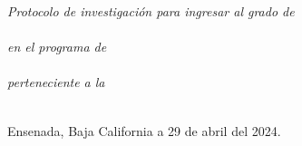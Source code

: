 \documentclass[
12pt, %
spanish, %
singlespacing, %
headsepline, %
]{MastersDoctoralThesis} %
\begin{document}
\begin{titlepage}
\begin{center}

\large \textit{Protocolo de investigación para ingresar al grado de\\\degreename}\\[0.5cm] %
\textit{en el programa de}\\\deptname\\[0.5cm]
\textit{perteneciente a la}\\\facname\\[0.5cm] %

\vfill

\begin{flushright}
{\small Ensenada, Baja California a 29 de abril del 2024.}\\[2cm] %
\end{flushright}

\end{center}
\end{titlepage}



\end{document}
